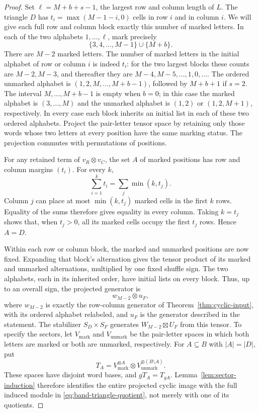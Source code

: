 \begin{proof}
Set $\ell=M+b+s-1$, the largest row and column length of $L$.
The triangle $D$ has $t_i=\max(M-1-i,0)$ cells in row $i$
and in column $i$.  We will give each full row and column block
exactly this number of marked letters.
In each of the two alphabets $1,\ldots,\ell$, mark precisely
\[
 \{3,4,\ldots,M-1\}\cup\{M+b\}.
\]
There are $M-2$ marked letters.  The number of marked letters in
the initial alphabet of row or column $i$ is indeed $t_i$:
for the two largest blocks these counts are
$M-2,M-3$, and thereafter they are $M-4,M-5,\ldots,1,0,\ldots$.
The ordered unmarked alphabet is
$(1,2,M,\ldots,M+b-1)$, followed by $M+b+1$ if $s=2$.
The interval $M,\ldots,M+b-1$ is empty when $b=0$; in this case
the marked alphabet is $(3,\ldots,M)$ and the unmarked alphabet
is $(1,2)$ or $(1,2,M+1)$, respectively.  In every case each
block inherits an initial list in each of these two ordered
alphabets.
Project the pair-letter tensor space by retaining only those words
whose two letters at every position have the same marking status.
The projection commutes with permutations of positions.

For any retained term of $v_R\otimes v_C$, the set $A$ of marked
positions has row and column margins $(t_i)$.  For every $k$,
\[
 \sum_{i=1}^k t_i=\sum_j\min(k,t_j).
\]
Column $j$ can place at most $\min(k,t_j)$ marked cells in the
first $k$ rows.  Equality of the sums therefore gives equality in
every column.  Taking $k=t_j$ shows that, when $t_j>0$, all its
marked cells occupy the first $t_j$ rows.  Hence $A=D$.

Within each row or column block, the marked and unmarked positions
are now fixed.  Expanding that block's alternation gives the tensor
product of its marked and unmarked alternations, multiplied by one
fixed shuffle sign.  The two alphabets, each in its inherited order,
have initial lists on every block.  Thus, up to an overall sign, the
projected generator is
\[
 w_{M-2}\otimes u_F,
\]
where $w_{M-2}$ is exactly the row-column generator of
Theorem~\ref{thm:cyclic-input}, with its ordered alphabet relabeled,
and $u_F$ is the generator described in the statement.
The stabilizer $S_D\times S_F$ generates
$W_{M-2}\boxtimes U_F$ from this tensor.  To specify the sectors,
let $V_{\mathrm{mark}}$ and $V_{\mathrm{unmark}}$ be the pair-letter
spaces in which both letters are marked or both are unmarked,
respectively.  For $A\subseteq B$ with $|A|=|D|$, put
\[
 T_A=V_{\mathrm{mark}}^{\otimes A}\otimes
          V_{\mathrm{unmark}}^{\otimes(B\setminus A)}.
\]
These spaces have disjoint word bases, and $gT_A=T_{gA}$.
Lemma~\ref{lem:sector-induction} therefore identifies the entire
projected cyclic image with the full induced module in
\eqref{eq:band-triangle-quotient}, not merely with one of its
quotients.


\end{proof}
